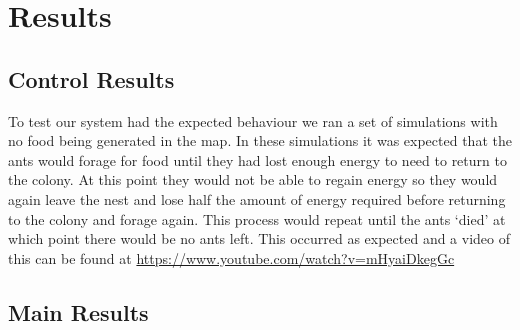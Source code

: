 \section{Results}
\subsection{Control Results}
To test our system had the expected behaviour we ran a set of simulations with no food being generated in the map. In these simulations it was expected that the ants would forage for food until they had lost enough energy to need to return to the colony. At this point they would not be able to regain energy so they would again leave the nest and lose half the amount of energy required before returning to the colony and forage again. This process would repeat until the ants `died' at which point there would be no ants left. This occurred as expected and a video of this can be found at \url{https://www.youtube.com/watch?v=mHyaiDkegGc}

\subsection{Main Results}

